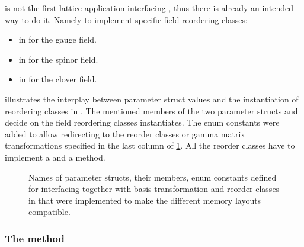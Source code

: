\Openqxd is not the first lattice application interfacing \quda, thus there is already an intended way to do it. Namely to implement specific field reordering classes\cite{QUDApaper}:
\begin{itemize}
  \item {} in  for the gauge field.
  \item {} in  for the spinor field.
  \item {} in  for the clover field.
\end{itemize}
 illustrates the interplay between parameter struct values and the instantiation of reordering classes in \quda. The mentioned members of the two parameter structs  and  decide on the field reordering classes \quda instantiates. The enum constants were added to allow redirecting to the \openqxd reorder classes or gamma matrix transformations specified in the last column of \cref{fig:reorder_interface}. All the reorder classes have to implement a  and a  method.
\begin{figure}
  
  \caption{Names of parameter structs, their members, enum constants defined for interfacing \openqxd together with basis transformation and reorder classes in \quda that were implemented to make the different memory layouts compatible.}
  \label{fig:reorder_interface}
\end{figure}

\subsubsection{The  method}

